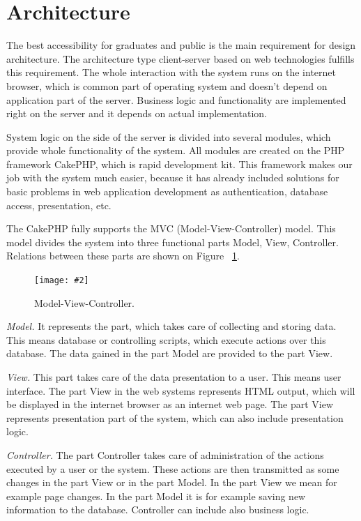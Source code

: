 \documentclass{iitsrc}[2006/14/02]
\newcommand\fig[4]{%
	\begin{figure}[h]
	\begin{center}
	\texttt{[image: \#2]}
	~\\%
	\caption{#4}
	\label{#3}
	\end{center}
	\end{figure}
}
\begin{document}
\section{Architecture}

The best accessibility for graduates and public is the main requirement for design architecture. The architecture type client-server based on web technologies fulfills this requirement. The whole interaction with the system runs on the internet browser, which is common part of operating system and doesn’t depend on application part of the server. Business logic and functionality are implemented right on the server and it depends on actual implementation.

System logic on the side of the server is divided into several modules, which provide whole functionality of the system. All modules are created on the PHP framework CakePHP, which is rapid development kit. This framework makes our job with the system much easier, because it has already included solutions for basic problems in web application development as authentication, database access, presentation, etc.

The CakePHP fully supports the MVC (Model-View-Controller) model\cite{cakephp}. This model divides the system into three functional parts Model, View, Controller. Relations between these parts are shown on Figure ~\ref{fig:mvc}.


\fig{width=7cm}{images/mvc}{fig:mvc}{Model-View-Controller.}

{\em Model.} It represents the part, which takes care of collecting and storing data. This means database or controlling scripts, which execute actions over this database. The data gained in the part Model are provided to the part View.

{\em View.} This part takes care of the data presentation to a user. This means user interface.  The part View in the web systems represents HTML output, which will be displayed in the internet browser as an internet web page. The part View represents presentation part of the system, which can also include presentation logic.

{\em Controller.} The part Controller takes care of administration of the actions executed by a user or the system. These actions are then transmitted as some changes in the part View or in the part Model. In the part View we mean for example page changes. In the part Model it is for example saving new information to the database. Controller can include also business logic.
      
\end{document}

